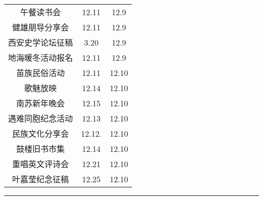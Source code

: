 \documentclass[letterpaper, 12pt]{article}
\begin{document}
\begin{multicols}{2}
{\begin{longtable}{|c|c|c|}
    午餐读书会 & 12.11 & 12.9\\
    健雄朋导分享会 & 12.11 & 12.9\\
    西安史学论坛征稿 & 3.20 & 12.9\\
    地海暖冬活动报名 & 12.11 & 12.9\\
    苗族民俗活动 & 12.11 & 12.10\\
    歌魅放映 & 12.14 & 12.10\\
    南苏新年晚会 & 12.15 & 12.10\\
    遇难同胞纪念活动 & 12.13 & 12.10\\
    民族文化分享会 & 12.12. & 12.10\\
    鼓楼旧书市集 & 12.14 & 12.10\\
    重唱英文评诗会 & 12.21 & 12.10\\
    叶嘉莹纪念征稿 & 12.25 & 12.10\\
    \hline
\end{longtable}
\unskip
\unpenalty
\unpenalty}\unvbox\colbbox
\end{multicols}
\hrule
\pagebreak
\end{document}
